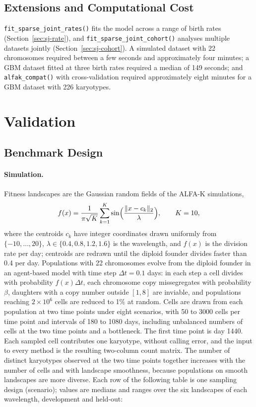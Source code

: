 \documentclass[11pt]{article}
\begin{document}
\subsection{Extensions and Computational Cost}

\begin{sloppypar}
\texttt{fit\_sparse\_joint\_rates()} fits the model across a range of birth
rates (Section~\ref{sec:sj-rate}), and \texttt{fit\_sparse\_joint\_cohort()}
analyses multiple datasets jointly (Section~\ref{sec:sj-cohort}). A simulated
dataset with 22 chromosomes required between a few seconds and approximately
four minutes; a GBM dataset fitted at three birth rates required a median of
149 seconds; and \texttt{alfak\_compat()} with cross-validation required
approximately eight minutes for a GBM dataset with 226 karyotypes.
\end{sloppypar}

\section{Validation}
\label{sec:validation}

\subsection{Benchmark Design}
\label{sec:val-design}

\paragraph{Simulation.}
Fitness landscapes are the Gaussian random fields of the ALFA-K simulations,
\begin{equation}
  f(x)=\frac{1}{\pi\sqrt K}\sum_{k=1}^{K}\sin\Bigl(\frac{\lVert x-c_k\rVert_2}{\lambda}\Bigr),
  \qquad K=10,
  \label{eq:grf}
\end{equation}
where the centroids $c_k$ have integer coordinates drawn uniformly from
$\{-10,\ldots,20\}$, $\lambda\in\{0.4,0.8,1.2,1.6\}$ is the wavelength, and
$f(x)$ is the division rate per day; centroids are redrawn until the diploid
founder divides faster than 0.4 per day. Populations with 22 chromosomes
evolve from the diploid founder in an agent-based model with time step
$\Delta t=0.1$ days: in each step a cell divides with probability
$f(x)\Delta t$, each chromosome copy missegregates with probability $\beta$,
daughters with a copy number outside $[1,8]$ are inviable, and populations
reaching $2\times10^6$ cells are reduced to 1\% at random. Cells are
drawn from each population at two time points under eight scenarios, with 50
to 3000 cells per time point and intervals of 180 to 1080 days, including
unbalanced numbers of cells at the two time points and a bottleneck. The first time point is day 1440. Each sampled cell
contributes one karyotype, without calling error, and the input to every
method is the resulting two-column count matrix. The number of distinct
karyotypes observed at the two time points together increases with the number of cells
and with landscape smoothness, because populations on smooth landscapes are
more diverse. Each row of the following table is one sampling design
(scenario); values are medians and ranges over the six landscapes of each
wavelength, development and held-out:
\end{document}
